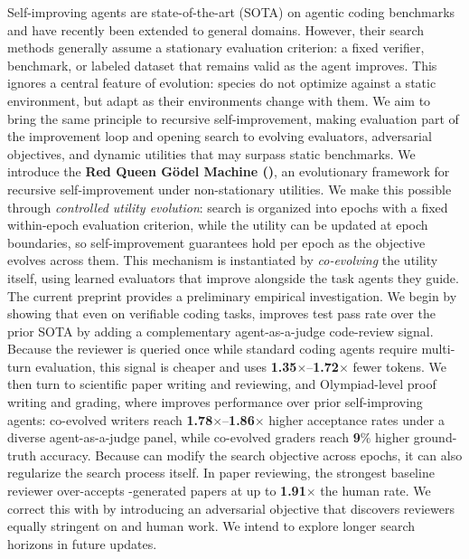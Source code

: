 Self-improving agents are state-of-the-art (SOTA) on agentic coding benchmarks and have recently been extended to general domains. However, their search methods generally assume a stationary evaluation criterion: a fixed verifier, benchmark, or labeled dataset that remains valid as the agent improves. This ignores a central feature of evolution: species do not optimize against a static environment, but adapt as their environments change with them. We aim to bring the same principle to recursive self-improvement, making evaluation part of the improvement loop and opening search to evolving evaluators, adversarial objectives, and dynamic utilities that may surpass static benchmarks.
We introduce the \textbf{Red Queen G\"odel Machine (\ourmethod)}\footnotemark{}, an evolutionary framework for recursive self-improvement under non-stationary utilities. We make this possible through \emph{controlled utility evolution}: search is organized into epochs with a fixed within-epoch evaluation criterion, while the utility can be updated at epoch boundaries, so self-improvement guarantees hold per epoch as the objective evolves across them. This mechanism is instantiated by \emph{co-evolving} the utility itself, using learned evaluators that improve alongside the task agents they guide. The current preprint provides a preliminary empirical investigation. We begin by showing that even on verifiable coding tasks, \theourmethod improves test pass rate over the prior SOTA by adding a complementary agent-as-a-judge code-review signal. Because the reviewer is queried once while standard coding agents require multi-turn evaluation, this signal is cheaper and \theourmethod uses \textbf{1.35}$\boldsymbol{\times}$--\textbf{1.72}$\boldsymbol{\times}$ fewer tokens. We then turn to scientific paper writing and reviewing, and Olympiad-level proof writing and grading, where \theourmethod improves performance over prior self-improving agents: co-evolved writers reach \textbf{1.78}$\boldsymbol{\times}$--\textbf{1.86}$\boldsymbol{\times}$ higher acceptance rates under a diverse agent-as-a-judge panel, while co-evolved graders reach \textbf{9}$\boldsymbol{\%}$ higher ground-truth accuracy. Because \theourmethod can modify the search objective across epochs, it can also regularize the search process itself. In paper reviewing, the strongest baseline reviewer over-accepts \AI-generated papers at up to \textbf{1.91}$\boldsymbol{\times}$ the human rate. We correct this with \theourmethod by introducing an adversarial objective that discovers reviewers equally stringent on \AI{} and human work. We intend to explore longer search horizons in future updates.